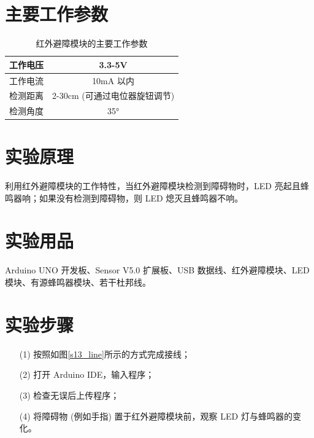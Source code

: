 \documentclass[UTF8, oneside]{ctexbook}
\begin{document}
\section{主要工作参数}
\begin{table}[h]
    \centering
    \begin{tabular}{|l|c|}
    \hline
    \multicolumn{1}{|c|}{工作电压} & 3.3-5V              \\ \hline
    工作电流                       & 10mA 以内             \\ \hline
    检测距离                       & 2-30cm (可通过电位器旋钮调节) \\ \hline
    检测角度                       & 35°                 \\ \hline
    \end{tabular}
    \caption{红外避障模块的主要工作参数}
\end{table}

\section{实验原理}
\paragraph{}
利用红外避障模块的工作特性，当红外避障模块检测到障碍物时，LED 亮起且蜂鸣器响；如果没有检测到障碍物，则 LED 熄灭且蜂鸣器不响。

\section{实验用品}
\paragraph{}
Arduino UNO 开发板、Sensor V5.0 扩展板、USB 数据线、红外避障模块、LED 模块、有源蜂鸣器模块、若干杜邦线。

\section{实验步骤}
\begin{itemize}
    \item[(1)] 按照如图\ref{s13_line}所示的方式完成接线；
    \item[(2)] 打开 Arduino IDE，输入程序；
    \item[(3)] 检查无误后上传程序；
    \item[(4)] 将障碍物 (例如手指) 置于红外避障模块前，观察 LED 灯与蜂鸣器的变化。
\end{itemize}
\end{document}
